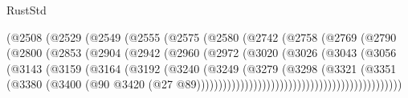 \begin{lexlean}{RustStd}
\begin{coremodule}
                              (@2508
                                (@2529
                                  (@2549
                                    (@2555
                                      (@2575
                                        (@2580
                                          (@2742
                                            (@2758
                                              (@2769
                                                (@2790
                                                  (@2800
                                                    (@2853
                                                      (@2904
                                                        (@2942
                                                          (@2960
                                                            (@2972
                                                              (@3020
                                                                (@3026
                                                                  (@3043
                                                                    (@3056
                                                                      (@3143
                                                                        (@3159
                                                                          (@3164
                                                                            (@3192
                                                                              (@3240
                                                                                (@3249
                                                                                  (@3279
                                                                                    (@3298
                                                                                      (@3321
                                                                                        (@3351
                                                                                          (@3380
                                                                                            (@3400
                                                                                              (@90
                                                                                                @3420
                                                                                                (@27
                                                                                                  @89)))))))))))))))))))))))))))))))))))))))))))))))

\end{coremodule}
\end{lexlean}
